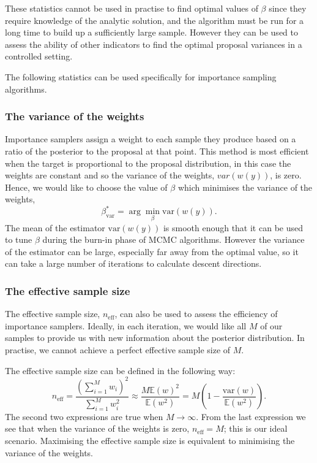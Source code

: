 \documentclass[final]{siamltex}
\newcommand{\neff}{n_{\text{eff}}}
\newcommand{\E}{{\mathbb E}}
\begin{document}
These statistics cannot be used in practise to find optimal values of
$\beta$ since they require knowledge of the analytic solution, and
the algorithm must be run for a long time to build up a
sufficiently large sample. However they can be used to assess the
ability of other indicators to find the optimal proposal
variances in a controlled setting.

The following statistics can be used specifically for importance sampling algorithms.

\subsubsection{The variance of the weights}

Importance samplers assign a weight to each sample they produce based on a ratio of the posterior to the proposal at that point. This method is most efficient when the target is proportional to the proposal distribution, in this case the weights are constant and so the variance of the weights, $var(w(y))$, is zero. Hence, we would like to choose the value of $\beta$ which minimises the variance of the weights,
\[
	\beta^*_{\text{var}} = \arg\min_{\beta} \text{var}(w(y)).
\]
The mean of the estimator $\text{var}(w(y))$ is smooth enough that it can be used to tune $\beta$ during the burn-in phase of MCMC algorithms. However the variance of the estimator can be large, especially far away from the optimal value, so it can take a large number of iterations to calculate descent directions.

\subsubsection{The effective sample size}\label{sec:ess}

The effective sample size, $\neff$, can also be used to assess the efficiency of importance samplers. Ideally, in each iteration, we would like all $M$ of our samples to provide us with new information about the posterior distribution. In practise, we cannot achieve a perfect effective sample size of $M$.

The effective sample size can be defined in the following way:
\[
	\neff = \frac{\left(\sum_{i=1}^M \! w_i\right)^2}{\sum_{i=1}^M \! w_i^2} \approx \frac{M\E(w)^2}{\E(w^2)} = M\left(1 - \frac{\mbox{var}(w)}{\mathbb{E}(w^2)}\right).
\]
The second two expressions are true when $M\rightarrow\infty$. From
the last expression we see that when the variance of the weights is
zero, $\neff = M$; this is our ideal scenario. Maximising the effective sample size is equivalent to minimising the variance of the weights.
\end{document}
